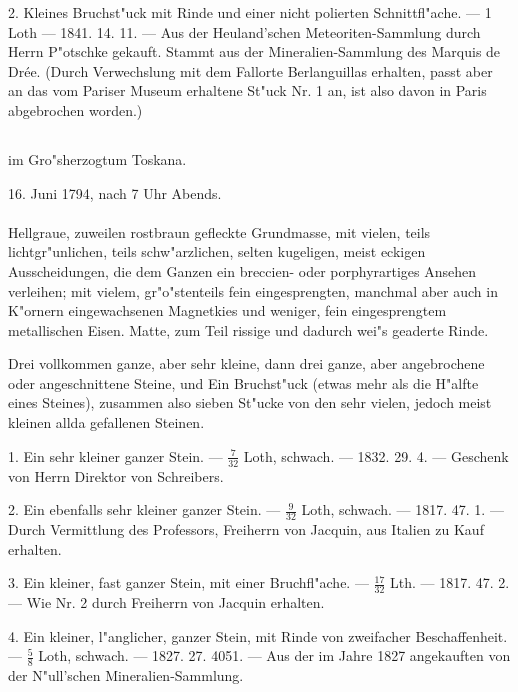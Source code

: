 \documentclass[a4paper, 11pt, oneside, polutonikogreek, german]{article}
\begin{document}
2. Kleines Bruchst"uck mit Rinde und einer nicht polierten Schnittfl"ache. --- 1 Loth --- 1841. 14. 11. --- Aus der Heuland'schen Meteoriten-Sammlung durch Herrn P"otschke gekauft. Stammt aus der Mineralien-Sammlung des Marquis de Drée. (Durch Verwechslung mit dem Fallorte Berlanguillas erhalten, passt aber an das vom Pariser Museum erhaltene St"uck Nr. 1 an, ist also davon in Paris abgebrochen worden.)
\subsection[\swabfamily {Siena.}]{}
\begin{center}

im Gro"sherzogtum Toskana.

16. Juni 1794, nach 7 Uhr Abends.
\end{center}
\paragraph{}
Hellgraue, zuweilen rostbraun gefleckte Grundmasse, mit vielen, teils lichtgr"unlichen, teils schw"arzlichen, selten kugeligen, meist eckigen Ausscheidungen, die dem Ganzen ein breccien- oder porphyrartiges Ansehen verleihen; mit vielem, gr"o"stenteils fein eingesprengten, manchmal aber auch in K"ornern eingewachsenen Magnetkies und weniger, fein eingesprengtem metallischen Eisen. Matte, zum Teil rissige und dadurch wei"s geaderte Rinde.

Drei vollkommen ganze, aber sehr kleine, dann drei ganze, aber angebrochene oder angeschnittene Steine, und Ein Bruchst"uck (etwas mehr als die H"alfte eines Steines), zusammen also sieben St"ucke von den sehr vielen, jedoch meist kleinen allda gefallenen Steinen.

1. Ein sehr kleiner ganzer Stein. --- $\mathfrak{\frac{7}{32}}$ Loth, schwach. --- 1832. 29. 4. --- Geschenk von Herrn Direktor von Schreibers.

2. Ein ebenfalls sehr kleiner ganzer Stein. --- $\mathfrak{\frac{9}{32}}$ Loth, schwach. --- 1817. 47. 1. --- Durch Vermittlung des Professors, Freiherrn von Jacquin, aus Italien zu Kauf erhalten.

3. Ein kleiner, fast ganzer Stein, mit einer Bruchfl"ache. --- $\mathfrak{\frac{17}{32}}$ Lth. --- 1817. 47. 2. --- Wie Nr. 2 durch Freiherrn von Jacquin erhalten.

4. Ein kleiner, l"anglicher, ganzer Stein, mit Rinde von zweifacher Beschaffenheit. --- $\mathfrak{\frac{5}{8}}$ Loth, schwach. --- 1827. 27. 4051. --- Aus der im Jahre 1827 angekauften von der N"ull'schen Mineralien-Sammlung.
\end{document}
